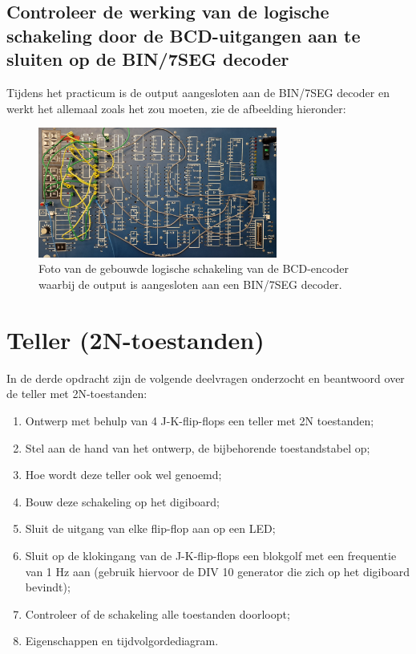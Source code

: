\documentclass[12pt]{article}
\begin{document}
\subsection{Controleer de werking van de logische schakeling door de BCD-uitgangen aan te sluiten op de BIN/7SEG decoder}
Tijdens het practicum is de output aangesloten aan de BIN/7SEG decoder en werkt het allemaal zoals het zou moeten, zie de afbeelding hieronder:
\begin{figure}[h]
    \centering
    \includegraphics[width=0.7\textwidth]{bcd7.jpg}
    \caption{Foto van de gebouwde logische schakeling van de BCD-encoder waarbij de output is aangesloten aan een BIN/7SEG decoder.}
    \label{fig:bcd7}
\end{figure}
\pagebreak
\section{Teller (2N-toestanden)}
In de derde opdracht zijn de volgende deelvragen onderzocht en beantwoord over de teller met 2N-toestanden:
\begin{enumerate}
    \item Ontwerp met behulp van 4 J-K-flip-flops een teller met 2N toestanden;
    \item Stel aan de hand van het ontwerp, de bijbehorende toestandstabel op;
    \item Hoe wordt deze teller ook wel genoemd;
    \item Bouw deze schakeling op het digiboard;
    \item Sluit de uitgang van elke flip-flop aan op een LED;
    \item Sluit op de klokingang van de J-K-flip-flops een blokgolf met een frequentie van 1 Hz aan (gebruik hiervoor de DIV 10 generator die zich op het digiboard bevindt);
    \item Controleer of de schakeling alle toestanden doorloopt;
    \item Eigenschappen en tijdvolgordediagram.
\end{enumerate}
\pagebreak
\end{document}
